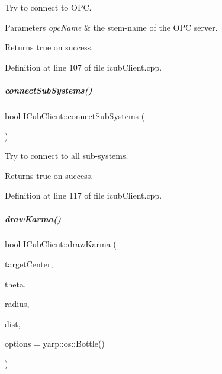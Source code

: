 Try to connect to O\+PC. 


\begin{DoxyParams}{Parameters}
{\em opc\+Name} & the stem-\/name of the O\+PC server. \\
\hline
\end{DoxyParams}
\begin{DoxyReturn}{Returns}
true on success. 
\end{DoxyReturn}


Definition at line 107 of file icub\+Client.\+cpp.

\mbox{\label{group__icubclient__clients_a7cb4ce150f6033c93d68380ab50106db}} 
\subparagraph{\texorpdfstring{connect\+Sub\+Systems()}{connectSubSystems()}}
{\footnotesize\ttfamily bool I\+Cub\+Client\+::connect\+Sub\+Systems (\begin{DoxyParamCaption}{ }\end{DoxyParamCaption})}



Try to connect to all sub-\/systems. 

\begin{DoxyReturn}{Returns}
true on success. 
\end{DoxyReturn}


Definition at line 117 of file icub\+Client.\+cpp.

\mbox{\label{group__icubclient__clients_a328124b23108364ed78abced438e88c5}} 
\subparagraph{\texorpdfstring{draw\+Karma()}{drawKarma()}}
{\footnotesize\ttfamily bool I\+Cub\+Client\+::draw\+Karma (\begin{DoxyParamCaption}\item[{const yarp\+::sig\+::\+Vector\+Of$<$ double $>$ \&}]{target\+Center,  }\item[{const double \&}]{theta,  }\item[{const double \&}]{radius,  }\item[{const double \&}]{dist,  }\item[{const yarp\+::os\+::\+Bottle \&}]{options = {\ttfamily yarp\+:\+:os\+:\+:Bottle()} }\end{DoxyParamCaption})}



